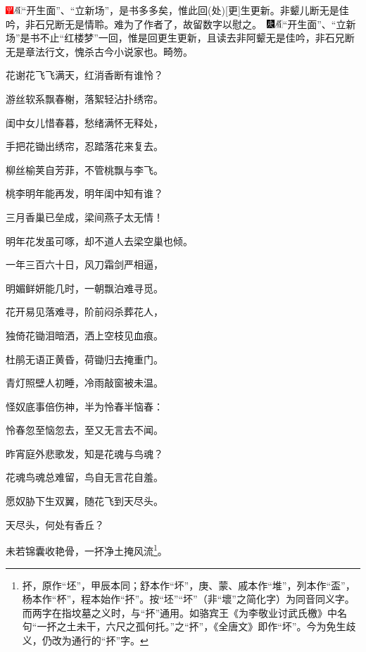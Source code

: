 {{\includegraphics[width=3mm]{../Images/00002}\includegraphics[width=3mm]{../Images/00010}\footnotesize \kaishu “开生面”、“立新场”，是书多多矣，惟此回{(处)}{[}更{]}生更新。非颦儿断无是佳吟，非石兄断无是情聆。难为了作者了，故留数字以慰之。　\includegraphics[width=3mm]{../Images/00004}\includegraphics[width=3mm]{../Images/00010}\footnotesize \kaishu “开生面”、“立新场”是书不止“红楼梦”一回，惟是回更生更新，且读去非阿颦无是佳吟，非石兄断无是章法行文，愧杀古今小说家也。畸笏。}}

花谢花飞飞满天，红消香断有谁怜？

游丝软系飘春榭，落絮轻沾扑绣帘。

闺中女儿惜春暮，愁绪满怀无释处，

手把花锄出绣帘，忍踏落花来复去。

柳丝榆荚自芳菲，不管桃飘与李飞。

桃李明年能再发，明年闺中知有谁？

三月香巢已垒成，梁间燕子太无情！

明年花发虽可啄，却不道人去梁空巢也倾。

一年三百六十日，风刀霜剑严相逼，

明媚鲜妍能几时，一朝飘泊难寻觅。

花开易见落难寻，阶前闷杀葬花人，

独倚花锄泪暗洒，洒上空枝见血痕。

杜鹃无语正黄昏，荷锄归去掩重门。

青灯照壁人初睡，冷雨敲窗被未温。

怪奴底事倍伤神，半为怜春半恼春：

怜春忽至恼忽去，至又无言去不闻。

昨宵庭外悲歌发，知是花魂与鸟魂？

花魂鸟魂总难留，鸟自无言花自羞。

愿奴胁下生双翼，随花飞到天尽头。

天尽头，何处有香丘？

未若锦囊收艳骨，一抔净土掩风流\footnote{抔，原作“坯”，甲辰本同；舒本作“坏”，庚、蒙、戚本作“堆”，列本作“盃”，杨本作“杯”，程本始作“抔”。按“坯”“坏”（非“壞”之简化字）为同音同义字。而两字在指坟墓之义时，与“抔”通用。如骆宾王《为李敬业讨武氏檄》中名句“一抔之土未干，六尺之孤何托。”之“抔”，《全唐文》即作“坏”。今为免生歧义，仍改为通行的“抔”字。}。

